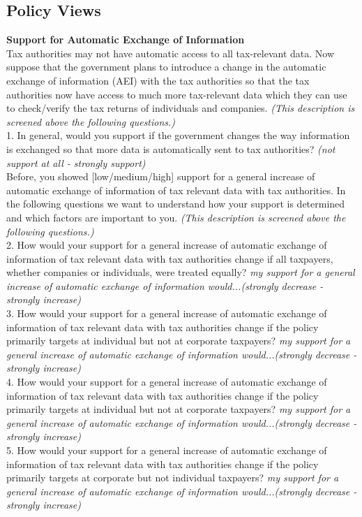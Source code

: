 \documentclass[11pt]{article}
\begin{document}
\subsection*{Policy Views}
\textbf{Support for Automatic Exchange of Information} \\[0.5em]
Tax authorities may not have automatic access to all tax-relevant data. Now suppose that the government plans to introduce a change in the automatic exchange of information (AEI) with the tax authorities so that the tax authorities now have access to much more tax-relevant data which they can use to check/verify the tax returns of individuals and companies. \textit{(This description is screened above the following questions.)} \\[0.5em]
1. In general, would you support if the government changes the way information is exchanged so that more data is automatically sent to tax authorities? \textit{(not support at all - strongly support)}\\[1em]
Before, you showed [low/medium/high] support for a general increase of automatic exchange of information of tax relevant data with tax authorities. In the following questions we want to understand how your support is determined and which factors are important to you. \textit{(This description is screened above the following questions.)} \\[0.5em]
2. How would your support for a general increase of automatic exchange of information of tax relevant data with tax authorities change if all taxpayers, whether companies or individuals, were treated equally? \textit{my support for a general increase of automatic exchange of information would...(strongly decrease - strongly increase)} \\[0.5em]
3.  How would your support for a general increase of automatic exchange of information of tax relevant data with tax authorities change if the policy primarily targets at individual but not at corporate taxpayers? \textit{my support for a general increase of automatic exchange of information would...(strongly decrease - strongly increase)} \\[0.5em]
4. How would your support for a general increase of automatic exchange of information of tax relevant data with tax authorities change if the policy primarily targets at individual but not at corporate taxpayers? \textit{my support for a general increase of automatic exchange of information would...(strongly decrease - strongly increase)} \\[0.5em]
5. How would your support for a general increase of automatic exchange of information of tax relevant data with tax authorities change if the policy primarily targets at corporate but not individual taxpayers? \textit{my support for a general increase of automatic exchange of information would...(strongly decrease - strongly increase)} \\[0.5em]
\end{document}
